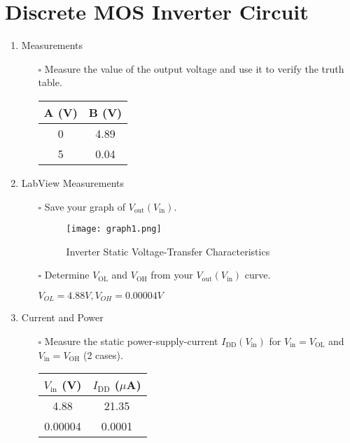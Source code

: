 \documentclass[12pt]{article}
\begin{document}
\section{Discrete MOS Inverter Circuit}
\begin{enumerate}
\item Measurements
\begin{itemize}
    \item[$\square$] Measure the value of the output voltage and use it to verify the truth table.

\begin{tabular}{|c|c|}
\hline
A (V) & B (V) \\
\hline
0 & 4.89 \\
5 & 0.04 \\
\hline
\end{tabular}

    
\end{itemize}
\item LabView Measurements
\begin{itemize}
    \item [$\square$] Save your graph of $V_\mathrm{out}(V_\mathrm{in})$.

\begin{figure}[h]
    \centering
    \texttt{[image: graph1.png]}
    \caption{Inverter Static Voltage-Transfer Characteristics}
    \label{fig:Static-Voltage-Transfer-Characteristics}
\end{figure}

    
    \item [$\square$] Determine $V_\mathrm{OL}$ and $V_\mathrm{OH}$ from your $V_\mathrm{out}(V_\mathrm{in})$ curve.

    $V_{OL} = 4.88 V, V_{OH} = 0.00004 V$
    
\end{itemize}
\item Current and Power
\begin{itemize}
    \item[$\square$] Measure the static power-supply-current $I_\mathrm{DD}(V_\mathrm{in})$ for $V_\mathrm{in} = V_\mathrm{OL}$ and $V_\mathrm{in} = V_\mathrm{OH}$ (2 cases).

\begin{tabular}{|c|c|}
\hline
$V_\mathrm{in}$ (V) & $I_\mathrm{DD}$ ($\mu$A) \\
\hline
4.88 & 21.35 \\
0.00004 & 0.0001 \\
\hline
\end{tabular}


\end{itemize}
\end{enumerate}
\end{document}
